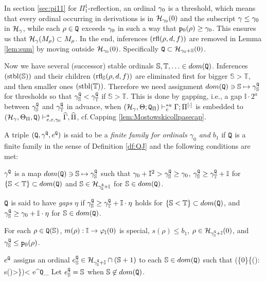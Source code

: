 \documentclass{article}
\newcommand{\mS}{\mathbb{S}}
\newcommand{\mI}{\mathbb{I}}
\newcommand{\mT}{\mathbb{T}}
\begin{document}
In section \ref{sec:pi11} for $\Pi^{1}_{1}$-reflection, an ordinal $\gamma_{0}$ is a threshold, which means that
every ordinal occurring in derivations is in ${\cal H}_{\gamma_{0}}(0)$ and
the subscript $\gamma\leq\gamma_{0}$ in ${\cal H}_{\gamma}$, while
each $\rho\in{\tt Q}$ exceeds $\gamma_{0}$ in such a way that
${\tt p}_{0}(\rho)\geq\gamma_{0}$.
This ensures us that ${\cal H}_{\gamma}(M_{\rho})\subset M_{\rho}$.
In the end, inferences $({\rm rfl}(\rho,d,f))$ are removed in Lemma \ref{lem:sum}
by moving outside ${\cal H}_{\gamma_{0}}(0)$.
Specifically ${\tt Q}\subset\calh_{\gam_{0}+\mS}(0)$.

Now we have several (successor) stable ordinals $\mS,\mT,\ldots\in dom({\tt Q})$.
Inferences $({\rm stbl}(\mS))$ and their children $({\rm rfl}_{\mS}(\rho,d,f))$ are eliminated
first for bigger $\mS>\mT$, and then smaller ones $({\rm stbl}(\mT))$.
Therefore we need assignment $dom({\tt Q})\ni\mS\mapsto\gam_{\mS}^{{\tt Q}}$ for 
thresholds so that
$\gam_{\mS}^{{\tt Q}}<\gam_{\mT}^{{\tt Q}}$ if $\mS>\mT$.
This is done by gapping, i.e., a gap $\mI\cdot 2^{a}$ between $\gam_{\mS}^{{\tt Q}}$ and 
$\gam_{\mT}^{{\tt Q}}$
in advance, when 
$
(\mathcal{H}_{\gamma},\Theta;{\tt Q}_{\Pi}
)\vdash^{* a}_{c}\Gamma;\Pi^{[\cdot]}
$
is embedded to
$(\mathcal{H}_{\gamma},\Theta_{\Pi}, {\tt Q})
\vdash^{a}_{c,c,\gamma_{0}}
\widehat{\Gamma},\widehat{\Pi}$, cf.\,Capping \ref{lem:Mostowskicollpasecap}.



\bdf\label{df:caphat}
{\rm
A triple $({\tt Q},\gamma^{{\tt Q}}, e^{{\tt Q}})$ 
is said to be a \textit{finite family for ordinals $\gamma_{0}$ and $b_{1}$}
if ${\tt Q}$ is a finite family in the sense of Definition \ref{df:QJ} and the following conditions are met:
 \benu
 
  \item
$\gamma^{{\tt Q}}$ is a map $dom({\tt Q})\ni\mS\mapsto\gam_{\mS}^{{\tt Q}}$ such that
$\gam_{0}+\mI^{2}>\gam^{{\tt Q}}_{\mS}\geq \gam_{0}$,
$\gam^{{\tt Q}}_{\mS}\geq \gam^{{\tt Q}}_{\mT}+\mI$ for $\{\mS<\mT\}\subset dom({\tt Q})$
and
$\mS\in\calh_{\gam^{{\tt Q}}_{\mS}+\mI}$ for $\mS\in dom({\tt Q})$.

 
 ${\tt Q}$ is said to have \textit{gaps} $\eta$ if
$\gam^{{\tt Q}}_{\mS}\geq \gam^{{\tt Q}}_{\mT}+\mI\cdot\eta$ holds
for $\{\mS<\mT\}\subset dom({\tt Q})$, and
$\gam^{{\tt Q}}_{\mS}\geq \gam_{0}+\mI\cdot\eta$ for $\mS\in dom({\tt Q})$.

  \item
For each $\rho\in{\tt Q}(\mS)$, 
$m(\rho):\mI \to\vphi_{\mI}(0)$ is special, $s(\rho)\leq b_{1}$,
$\rho\in\calh_{\gam_{\mS}^{{\tt Q}}+\mI}(0)$,
and $\gam_{\mS}^{{\tt Q}}\leq{\tt p}_{0}(\rho)$.




\item
$e^{{\tt Q}}$ assigns an ordinal $e_{\mS}^{{\tt Q}}\in\calh_{\gam^{{\tt Q}}_{\mS}+\mI}\cap(\mS+1)$ to each $\mS\in dom({\tt Q})$ such that
\beqn\label{eq:familye}
\max(\{0\}\cup\{\rho{}(\mS): s(\rho)>\mS\})< e^{{\tt Q}}_{\mS}
\eeqn
Let $e^{{\tt Q}}_{\mS}=\mS$ when $\mS\not\in dom({\tt Q})$.

\eenu

}
\edf
\end{document}
